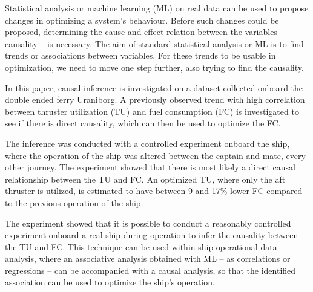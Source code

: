 Statistical analysis or machine learning (ML) on real data can be used to propose changes in optimizing a system's behaviour. Before such changes could be proposed, determining the cause and effect relation between the variables -- causality -- is necessary.
The aim of standard statistical analysis or ML is to find trends or associations between variables. 
For these trends to be usable in optimization, we need to move one step further, also trying to find the causality.

In this paper, causal inference is investigated on a dataset collected onboard the double ended ferry Uraniborg.
A previously observed trend with high correlation between thruster utilization (TU) and fuel consumption (FC) is investigated to see if there is direct causality, which can then be used to optimize the FC.

The inference was conducted with a controlled experiment onboard the ship, where the operation of the ship was altered between the captain and mate, every other journey.
The experiment showed that there is most likely a direct causal relationship between the TU and FC.
An optimized TU, where only the aft thruster is utilized, is estimated to have between 9 and 17\% lower FC compared to the previous operation of the ship.

The experiment showed that it is possible to conduct a reasonably controlled experiment onboard a real ship during operation to infer the causality between the TU and FC.
This technique can be used within ship operational data analysis, where an associative analysis obtained with ML -- as correlations or regressions --  can be accompanied with a causal analysis, so that the identified association can be used to optimize the ship's operation.






